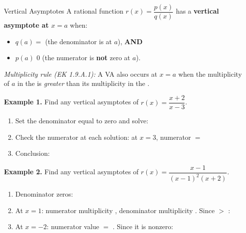 \documentclass[10pt]{article}
\begin{document}
\begin{notesbox}{Vertical Asymptotes}
A rational function $r(x) = \dfrac{p(x)}{q(x)}$ has a \textbf{vertical asymptote at $x = a$} when:

\begin{itemize}
  \item $q(a) =$ \blank{1.5cm} \quad (the denominator is \blank{2.5cm} at $a$), \textbf{AND}
  \item $p(a)$ \blank{0.8cm} $0$ \quad (the numerator is \textbf{not} zero at $a$).
\end{itemize}

\textit{Multiplicity rule (EK 1.9.A.1):} A VA also occurs at $x = a$ when the multiplicity of
$a$ in the \blank{3cm} is \emph{greater} than its multiplicity in the \blank{3cm}.

\medskip
\textbf{Example 1.} Find any vertical asymptotes of $r(x) = \dfrac{x + 2}{x - 3}$.

\begin{enumerate}[label=\textbf{Step \arabic*.}, itemsep=4pt]
  \item Set the denominator equal to zero and solve: \blank{5cm}

  \item Check the numerator at each solution: at $x = 3$, numerator $=$ \blank{2cm}

  \item Conclusion: \blank{7cm}
\end{enumerate}

\medskip
\textbf{Example 2.} Find any vertical asymptotes of $r(x) = \dfrac{x - 1}{(x-1)^2(x+2)}$.

\begin{enumerate}[label=\textbf{Step \arabic*.}, itemsep=4pt]
  \item Denominator zeros: \blank{5cm}

  \item At $x = 1$: numerator multiplicity \blank{0.8cm}, denominator multiplicity \blank{0.8cm}.
        Since \blank{0.8cm} $>$ \blank{0.8cm}: \blank{4cm}

  \item At $x = -2$: numerator value $=$ \blank{2cm}. Since it is nonzero: \blank{4cm}
\end{enumerate}
\end{notesbox}

\vspace{0.1in}
\end{document}

